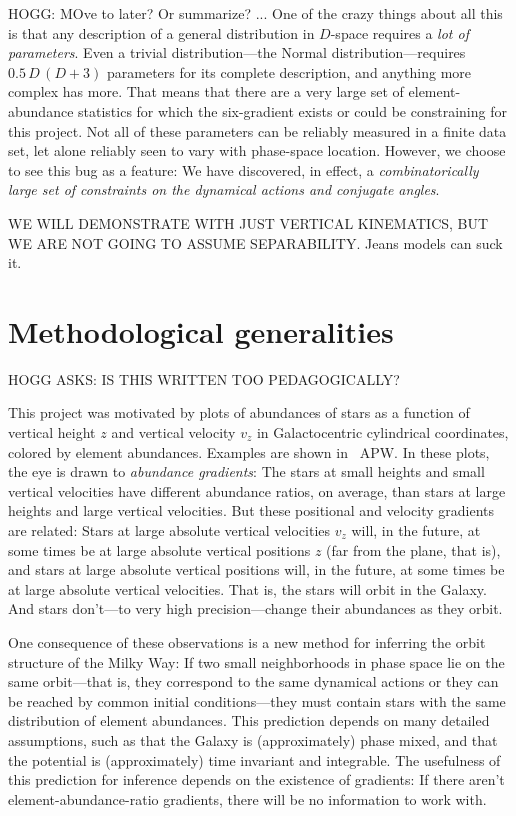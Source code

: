 \documentclass[modern]{aastex63}
\begin{document}
HOGG: MOve to later? Or summarize?
...
One of the crazy things about all this is that any description of a general distribution in $D$-space
requires a \emph{lot of parameters}.
Even a trivial distribution---the Normal distribution---requires $0.5\,D\,(D+3)$ parameters for its
complete description, and anything more complex has more.
That means that there are a very large set of element-abundance statistics for which the
six-gradient exists or could be constraining for this project.
Not all of these parameters can be reliably measured in a finite data set,
let alone reliably seen to vary with phase-space location.
However, we choose to see this bug as a feature:
We have discovered, in effect, a \emph{combinatorically large set of constraints on the
dynamical actions and conjugate angles}.

WE WILL DEMONSTRATE WITH JUST VERTICAL KINEMATICS, BUT WE ARE NOT
GOING TO ASSUME SEPARABILITY.  Jeans models can suck it.

\section{Methodological generalities}

HOGG ASKS: IS THIS WRITTEN TOO PEDAGOGICALLY?

This project was motivated by plots of abundances of stars as a
function of vertical height $z$ and vertical velocity $v_z$ in
Galactocentric cylindrical coordinates, colored by element abundances.
Examples are shown in \figurename~APW.
In these plots,
the eye is drawn to \emph{abundance gradients}: The stars at small
heights and small vertical velocities have different abundance ratios,
on average, than stars at large heights and large vertical velocities.
But these positional and velocity gradients are related:
Stars at large absolute vertical velocities $v_z$ will, in the future, at some
times be at large absolute vertical positions $z$ (far from the plane, that is),
and stars at large absolute vertical positions will, in the future,
at some times be at large absolute vertical velocities.
That is, the stars will orbit in the Galaxy.
And stars don't---to very high precision---change their abundances as
they orbit.

One consequence of these observations is a new method for inferring
the orbit structure of the Milky Way:
If two small neighborhoods in phase space lie on the same orbit---that
is, they correspond to the same dynamical actions or they can be reached
by common initial conditions---they must contain stars with the same distribution of
element abundances.
This prediction depends on many detailed assumptions, such as that
the Galaxy is (approximately) phase mixed, and that the potential is
(approximately) time invariant and integrable.
The usefulness of this prediction for inference
depends on the existence of gradients: If there aren't
element-abundance-ratio gradients, there will be no information to work
with.
\end{document}
